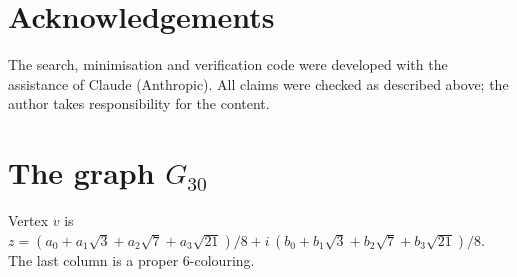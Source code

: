 \documentclass[11pt,a4paper]{amsart}
\theoremstyle{remark}
\begin{document}
\section*{Acknowledgements}
The search, minimisation and verification code were developed with the assistance of Claude (Anthropic). All claims were checked as described above; the author takes responsibility for the content.




\appendix
\section{The graph $G_{30}$}\label{app:g30}

Vertex $v$ is $z=(a_0+a_1\sqrt3+a_2\sqrt7+a_3\sqrt{21})/8+i\,(b_0+b_1\sqrt3+b_2\sqrt7+b_3\sqrt{21})/8$. The last column is a proper $6$-colouring.
\end{document}
